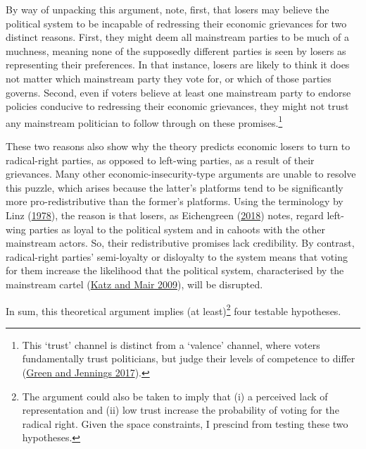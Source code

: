 \documentclass[
]{article}
\begin{document}
By way of unpacking this argument, note, first, that losers may believe
the political system to be incapable of redressing their economic
grievances for two distinct reasons. First, they might deem all
mainstream parties to be much of a muchness, meaning none of the
supposedly different parties is seen by losers as representing their
preferences. In that instance, losers are likely to think it does not
matter which mainstream party they vote for, or which of those parties
governs. Second, even if voters believe at least one mainstream party to
endorse policies conducive to redressing their economic grievances, they
might not trust any mainstream politician to follow through on these
promises.\footnote{This `trust' channel is distinct from a `valence'
  channel, where voters fundamentally trust politicians, but judge their
  levels of competence to differ
  (\protect\hyperlink{ref-green_politics_2017}{Green and Jennings
  2017}).}

These two reasons also show why the theory predicts economic losers to
turn to radical-right parties, as opposed to left-wing parties, as a
result of their grievances. Many other economic-insecurity-type
arguments are unable to resolve this puzzle, which arises because the
latter's platforms tend to be significantly more pro-redistributive than
the former's platforms. Using the terminology by Linz
(\protect\hyperlink{ref-linz_breakdown_1978}{1978}), the reason is that
losers, as Eichengreen
(\protect\hyperlink{ref-eichengreen_populist_2018}{2018}) notes, regard
left-wing parties as loyal to the political system and in cahoots with
the other mainstream actors. So, their redistributive promises lack
credibility. By contrast, radical-right parties' semi-loyalty or
disloyalty to the system means that voting for them increase the
likelihood that the political system, characterised by the mainstream
cartel (\protect\hyperlink{ref-katz_cartel_2009}{Katz and Mair 2009}),
will be disrupted.

In sum, this theoretical argument implies (at least)\footnote{The
  argument could also be taken to imply that (i) a perceived lack of
  representation and (ii) low trust increase the probability of voting
  for the radical right. Given the space constraints, I prescind from
  testing these two hypotheses.} four testable hypotheses.
\end{document}
